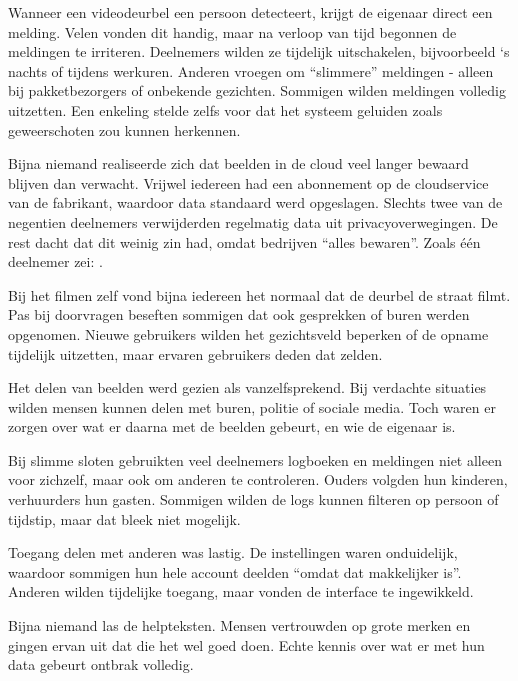 \documentclass[nonacm, sigconf, balance=true]{acmart}
\begin{document}
    Wanneer een videodeurbel een persoon detecteert, krijgt de eigenaar direct een melding.
    Velen vonden dit handig, maar na verloop van tijd begonnen de meldingen te irriteren.
    Deelnemers wilden ze tijdelijk uitschakelen, bijvoorbeeld `s nachts of tijdens werkuren.
    Anderen vroegen om ``slimmere'' meldingen - alleen bij pakketbezorgers of onbekende gezichten.
    Sommigen wilden meldingen volledig uitzetten.
    Een enkeling stelde zelfs voor dat het systeem geluiden zoals geweerschoten zou kunnen herkennen.

    Bijna niemand realiseerde zich dat beelden in de cloud veel langer bewaard blijven dan verwacht.
    Vrijwel iedereen had een abonnement op de cloudservice van de fabrikant, waardoor data standaard werd opgeslagen.
    Slechts twee van de negentien deelnemers verwijderden regelmatig data uit privacyoverwegingen.
    De rest dacht dat dit weinig zin had, omdat bedrijven ``alles bewaren''.
    Zoals één deelnemer zei:
    .

    Bij het filmen zelf vond bijna iedereen het normaal dat de deurbel de straat filmt.
    Pas bij doorvragen beseften sommigen dat ook gesprekken of buren werden opgenomen.
    Nieuwe gebruikers wilden het gezichtsveld beperken of de opname tijdelijk uitzetten, maar ervaren gebruikers deden dat zelden.

    Het delen van beelden werd gezien als vanzelfsprekend.
    Bij verdachte situaties wilden mensen kunnen delen met buren, politie of sociale media.
    Toch waren er zorgen over wat er daarna met de beelden gebeurt, en wie de eigenaar is.

    Bij slimme sloten gebruikten veel deelnemers logboeken en meldingen niet alleen voor zichzelf, maar ook om anderen te controleren.
    Ouders volgden hun kinderen, verhuurders hun gasten.
    Sommigen wilden de logs kunnen filteren op persoon of tijdstip, maar dat bleek niet mogelijk.

    Toegang delen met anderen was lastig.
    De instellingen waren onduidelijk, waardoor sommigen hun hele account deelden ``omdat dat makkelijker is''.
    Anderen wilden tijdelijke toegang, maar vonden de interface te ingewikkeld.

    Bijna niemand las de helpteksten.
    Mensen vertrouwden op grote merken en gingen ervan uit dat die het wel goed doen.
    Echte kennis over wat er met hun data gebeurt ontbrak volledig.
\end{document}
